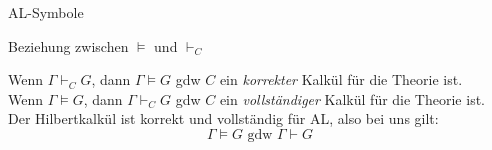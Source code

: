 \begin{frame}{AL-Symbole}

	\begin{alertblock}{Beziehung zwischen $\models$ und $\vdash_C$} 
		
		Wenn $\Gamma \vdash_C G$, dann $\Gamma \models G$ gdw $C$ ein \textit{korrekter} Kalkül für die Theorie ist.\\
		Wenn $\Gamma \models G$, dann $\Gamma \vdash_C G$ gdw $C$ ein \textit{vollständiger} Kalkül für die Theorie ist.\\

		Der Hilbertkalkül ist korrekt und vollständig für AL, also bei uns gilt: \[ \Gamma \models G \text{ gdw } \Gamma \vdash G\]

	\end{alertblock}


\end{frame}